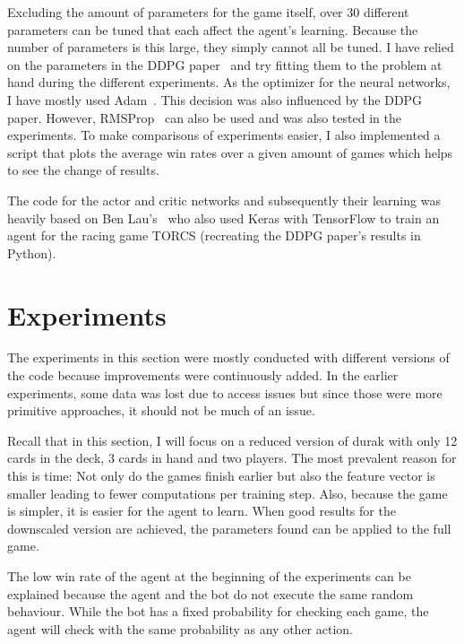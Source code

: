 \documentclass[a4paper,titlepage]{article}
\begin{document}
Excluding the amount of parameters for the game itself, over 30 different parameters can be tuned that each affect the agent's learning.
Because the number of parameters is this large, they simply cannot all be tuned. I have relied on the parameters in the DDPG paper~\cite[p.~11]{ddpg} and try fitting them to the problem at hand during the different experiments.
As the optimizer for the neural networks, I have mostly used Adam~\cite{adam}. This decision was also influenced by the DDPG paper. However, RMSProp~\cite{rmsprop} can also be used and was also tested in the experiments.
To make comparisons of experiments easier, I also implemented a script that plots the average win rates over a given amount of games which helps to see the change of results. \medskip

The code for the actor and critic networks and subsequently their learning was heavily based on Ben Lau's~\cite{torcs} who also used Keras with TensorFlow to train an agent for the racing game TORCS (recreating the DDPG paper's results in Python).

\newpage

\section{Experiments}

The experiments in this section were mostly conducted with different versions of the code because improvements were continuously added. In the earlier experiments, some data was lost due to access issues but since those were more primitive approaches, it should not be much of an issue.

Recall that in this section, I will focus on a reduced version of durak with only 12 cards in the deck, 3 cards in hand and two players. The most prevalent reason for this is time: Not only do the games finish earlier but also the feature vector is smaller leading to fewer computations per training step.
Also, because the game is simpler, it is easier for the agent to learn. When good results for the downscaled version are achieved, the parameters found can be applied to the full game.

The low win rate of the agent at the beginning of the experiments can be explained because the agent and the bot do not execute the same random behaviour. While the bot has a fixed probability for checking each game, the agent will check with the same probability as any other action.
\end{document}
